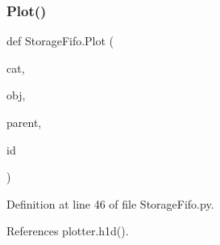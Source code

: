 \subsubsection{\texorpdfstring{Plot()}{Plot()}}
{\footnotesize\ttfamily def Storage\+Fifo.\+Plot (\begin{DoxyParamCaption}\item[{}]{cat,  }\item[{}]{obj,  }\item[{}]{parent,  }\item[{}]{id }\end{DoxyParamCaption})}



Definition at line 46 of file Storage\+Fifo.\+py.



References plotter.\+h1d().


